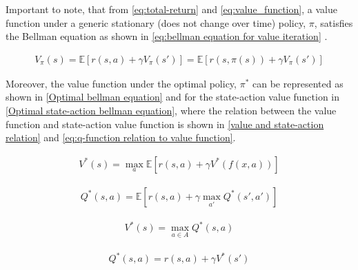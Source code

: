 Important to note, that from \autoref{eq:total-return} and \autoref{eq:value_function}, a value function under a generic stationary (does not change over time) policy, $\pi$, satisfies the Bellman equation as shown in \autoref{eq:bellman equation for value iteration} \cite{bertsekasNewtonMethodReinforcement2022,bellmanDynamicProgramming1966}.


\begin{equation}
	\begin{aligned}
		V_{\pi}(s) = \mathbb{E} \left[r(s,a) + \gamma V_{\pi}(s') \right] = \mathbb{E} \left[r(s,\pi(s)) + \gamma V_{\pi}(s') \right]
	\end{aligned}
	\label{eq:bellman equation for value iteration}
\end{equation}

Moreover, the value function under the optimal policy, $\pi^*$ can be represented as shown in \autoref{Optimal bellman equation} and for the state-action value function in \autoref{Optimal state-action bellman equation}, where the relation between the value function and state-action value function is shown in \autoref{value and state-action relation} and \autoref{eq:q-function relation to value function}.

\begin{equation}
	\begin{aligned}
		V^*(s) =\max_{a} \mathbb{E} \left[r(s,a) + \gamma V^*(f(x,a)) \right]
	\end{aligned}
	\label{Optimal bellman equation}
\end{equation}

\begin{equation}
	\begin{aligned}
		Q^*(s,a) =\mathbb{E} \left[r(s,a) + \gamma \max_{a'}Q^*(s',a') \right]
	\end{aligned}
	\label{Optimal state-action bellman equation}
\end{equation}

\begin{equation}
	\begin{aligned}
		V^*(s) = \max_{a\in A} Q^*(s, a)
	\end{aligned}
	\label{value and state-action relation}
\end{equation}

\begin{equation}
	\begin{aligned}
		Q^*(s,a) = r(s,a) + \gamma V^*(s') 
	\end{aligned}
	\label{eq:q-function relation to value function}
\end{equation}

